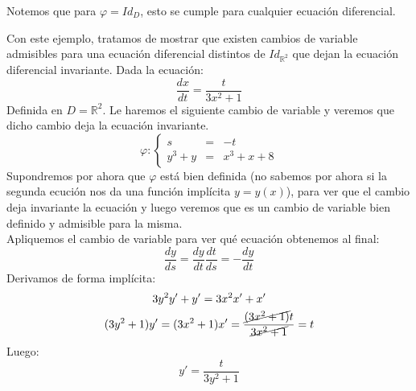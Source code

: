 Notemos que para $\varphi = Id_D$, esto se cumple para cualquier ecuación diferencial.

\begin{ejemplo}
    Con este ejemplo, tratamos de mostrar que existen cambios de variable admisibles para una ecuación diferencial distintos de $Id_{\mathbb{R}^2}$ que dejan la ecuación diferencial invariante. Dada la ecuación:
    \begin{equation*}
        \dfrac{dx}{dt} = \dfrac{t}{3x^2+1}
    \end{equation*}
    Definida en $D=\mathbb{R}^2$. Le haremos el siguiente cambio de variable y veremos que dicho cambio deja la ecuación invariante.
    \begin{equation*}
        \varphi: \left\{\begin{array}{rcl}
                s &= &-t \\
                y^3 + y &= &x^3+x+8
        \end{array}\right.
    \end{equation*}
    Supondremos por ahora que $\varphi$ está bien definida (no sabemos por ahora si la segunda ecución nos da una función implícita $y=y(x)$), para ver que el cambio deja invariante la ecuación y luego veremos que es un cambio de variable bien definido y admisible para la misma.\\

    Apliquemos el cambio de variable para ver qué ecuación obtenemos al final:
    \begin{equation*}
        \dfrac{dy}{ds} = \dfrac{dy}{dt} \dfrac{dt}{ds} = -\dfrac{dy}{dt} 
    \end{equation*}
    Derivamos de forma implícita:
    \begin{gather*}
        3y^2 y' + y' = 3x^2 x' + x' \\
        (3y^2 + 1)y' = (3x^2 + 1)x' = \dfrac{\cancel{(3x^2+1)}t}{\cancel{3x^2+1}} = t
    \end{gather*}
    Luego:
    \begin{equation*}
        y' = \dfrac{t}{3y^2 + 1}
    \end{equation*}


\end{ejemplo}
